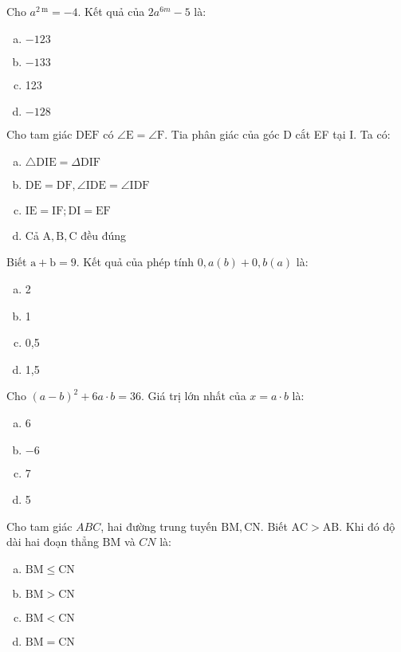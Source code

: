\begin{bt}
	Cho $a^{2 \mathrm{~m}}=-4$. Kết quả của $2 a^{6 m}-5$ là:
	\begin{enumerate}[a.]
		\item $-123$
		\item $-133$
		\item 123
		\item $-128$
	\end{enumerate}
	\loigiai{} 
\end{bt}

\begin{bt}
	Cho tam giác $\mathrm{DEF}$ có $\angle \mathrm{E}=\angle \mathrm{F}$. Tia phân giác của góc $\mathrm{D}$ cắt EF tại $\mathrm{I}$. Ta có:
	\begin{enumerate}[a.]
		\item $\triangle \mathrm{DIE}=\Delta \mathrm{DIF}$
		\item $\mathrm{DE}=\mathrm{DF}, \angle \mathrm{IDE}=\angle \mathrm{IDF}$
		\item $\mathrm{IE}=\mathrm{IF} ; \mathrm{DI}=\mathrm{EF}$
		\item Cả $\mathrm{A}, \mathrm{B}, \mathrm{C}$ đều đúng
	\end{enumerate}
	\loigiai{} 
\end{bt}

\begin{bt}
	Biết $\mathrm{a}+\mathrm{b}=9$. Kết quả của phép tính $0, a(b)+0, b(a)$ là:
	\begin{enumerate}[a.]
		\item 2
		\item 1
		\item 0,5
		\item 1,5
	\end{enumerate}
	\loigiai{} 
\end{bt}

\begin{bt}
	Cho $(a-b)^2+6 a \cdot b=36$. Giá trị lớn nhất của $x=a \cdot b$ là:
	\begin{enumerate}[a.]
		\item 6
		\item $-6$
		\item 7
		\item 5
	\end{enumerate}
	\loigiai{} 
\end{bt}

\begin{bt}
	Cho tam giác $A B C$, hai đường trung tuyến $\mathrm{BM}, \mathrm{CN}$. Biết $\mathrm{AC}>\mathrm{AB}$. Khi đó độ dài hai đoạn thẳng $\mathrm{BM}$ và $C N$ là:
	\begin{enumerate}[a.]
		\item $\mathrm{BM} \leq \mathrm{CN}$
		\item $\mathrm{BM}>\mathrm{CN}$
		\item $\mathrm{BM}<\mathrm{CN}$
		\item $\mathrm{BM}=\mathrm{CN}$
	\end{enumerate}
	\loigiai{} 
\end{bt}

